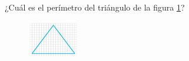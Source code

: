
\question[25]  ¿Cuál es el perímetro del triángulo de la figura \ref{fig:peri_isos_02}?
\begin{figure}[H]
    \begin{center}
        \includegraphics[width=0.2\textwidth]{../images/peri_isos_02.png}
    \end{center}
    \caption{}
    \label{fig:peri_isos_02}
\end{figure}